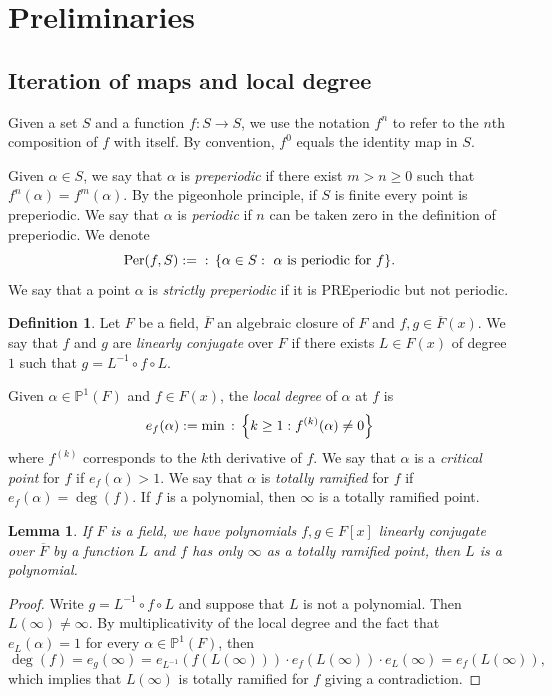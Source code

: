 \documentclass{amsart}
\def\set#1{{\def\st{\;:\;}\left\{#1\right\}}}
\def\PP{\mathbb P}
\DeclareMathOperator{\Per}{Per}
\DeclareMathOperator{\st}{st}
\newtheorem{lemma}[proposition]{Lemma}
\theoremstyle{definition}
\newtheorem{Definition}[proposition]{Definition}
\begin{document}
\section{Preliminaries}

\subsection{Iteration of maps and local degree}

Given a set $S$ and a function $f: S \rightarrow S$, we use the notation $f^n$ to refer to the $n$th composition of $f$ with itself. By convention, $f^0$ equals the identity map in $S$.

Given $\alpha \in S$, we say that $\alpha$ is \textit{preperiodic} if there exist $m > n \geq 0$ such that $f^n(\alpha) = f^m(\alpha)$. By the pigeonhole principle, if $S$ is finite every point is preperiodic. We say that $\alpha$ is \textit{periodic} if $n$ can be taken zero in the definition of preperiodic. We denote 
$$\Per(f,S) := \set{\alpha \in S: \text{ $\alpha$ is periodic for $f$}}.$$ We say that a point $\alpha$ is \textit{strictly preperiodic} if it is PREperiodic but not periodic. 


\begin{Definition}
Let $F$ be a field, $\overline{F}$ an algebraic closure of $F$ and $f,g \in \overline{F}(x)$. We say that $f$ and $g$ are \textit{linearly conjugate} over $F$ if there exists $L \in F(x)$ of degree $1$ such that $g = L^{-1} \circ f \circ L$.  
\end{Definition}

Given $\alpha \in \PP^1(F)$ and $f \in F(x)$, the \textit{local degree} of $\alpha$ at $f$ is $$e_f(\alpha) := \min \set{k \geq 1: f^{(k)}(\alpha) \neq 0}$$ where $f^{(k)}$ corresponds to the $k$th derivative of $f$. We say that $\alpha$ is a \textit{critical point} for $f$ if $e_f(\alpha) > 1$. We say that $\alpha$ is \textit{totally ramified} for $f$ if $e_f(\alpha) = \deg(f)$. If $f$ is a polynomial, then $\infty$ is a totally ramified point. 

\begin{lemma}
If $F$ is a field, we have polynomials $f,g \in F[x]$ linearly conjugate over $\overline{F}$ by a function $L$ and $f$ has only $\infty$ as a totally ramified point, then $L$ is a polynomial. 
\label{lemma: L is a polynomial}
\end{lemma}

\begin{proof}
Write $g = L^{-1} \circ f \circ L$ and suppose that $L$ is not a polynomial. Then $L(\infty) \neq \infty$. By multiplicativity of the local degree and the fact that $e_L(\alpha) = 1$ for every $\alpha \in \PP^1(F)$, then $$\deg(f) = e_g(\infty) = e_{L^{-1}}(f(L(\infty))) \cdot e_f(L(\infty)) \cdot e_L(\infty) = e_f(L(\infty)),$$ which implies that $L(\infty)$ is totally ramified for $f$ giving a contradiction.
\end{proof}
\end{document}
